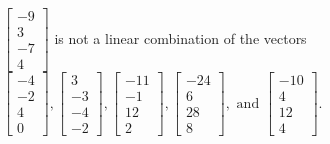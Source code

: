 \begin{exercise}
\begin{exerciseStatement}
  \end{exerciseStatement}
  \begin{exerciseAnswer}
   \(\left[\begin{array}{c}
-9 \\
3 \\
-7 \\
4
\end{array}\right]\) 
  	 is not  
	a linear combination of the vectors \(\left[\begin{array}{c}
-4 \\
-2 \\
4 \\
0
\end{array}\right] , \left[\begin{array}{c}
3 \\
-3 \\
-4 \\
-2
\end{array}\right] , \left[\begin{array}{c}
-11 \\
-1 \\
12 \\
2
\end{array}\right] , \left[\begin{array}{c}
-24 \\
6 \\
28 \\
8
\end{array}\right] , \text{ and } \left[\begin{array}{c}
-10 \\
4 \\
12 \\
4
\end{array}\right]\).

	
  


  \end{exerciseAnswer}
\end{exercise}